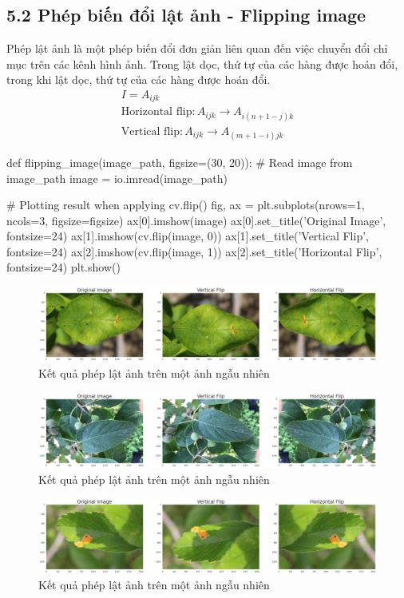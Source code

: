 \documentclass{article}
\begin{document}
	\subsection{5.2 Phép biến đổi lật ảnh - Flipping image}
	Phép lật ảnh là một phép biến đổi đơn giản liên quan đến việc chuyển đổi chỉ mục trên các kênh hình ảnh. Trong lật dọc, thứ tự của các hàng được hoán đổi, trong khi lật dọc, thứ tự của các hàng được hoán đổi.
	\begin{gather*}
	I = A_{ijk}\\
	\text{Horizontal flip}: A_{ijk} \rightarrow A_{i(n+1-j)k}\\
	\text{Vertical flip}: A_{ijk} \rightarrow A_{(m+1-i)jk}
	\end{gather*}
	\begin{python}
		def flipping_image(image_path, figsize=(30, 20)):
			# Read image from image_path
			image = io.imread(image_path)
			
			# Plotting result when applying cv.flip()
			fig, ax = plt.subplots(nrows=1, ncols=3, figsize=figsize)
			ax[0].imshow(image)
			ax[0].set_title('Original Image', fontsize=24)
			ax[1].imshow(cv.flip(image, 0))
			ax[1].set_title('Vertical Flip', fontsize=24)
			ax[2].imshow(cv.flip(image, 1))
			ax[2].set_title('Horizontal Flip', fontsize=24)
			plt.show()
	\end{python}
	\begin{figure}[H]
		\centering
		\includegraphics[width=1\linewidth]{images/flipping_image.png}
		\caption{Kết quả phép lật ảnh trên một ảnh ngẫu nhiên}
		\label{fig:writing-thesis}
	\end{figure}
	\begin{figure}[H]
		\centering
		\includegraphics[width=1\linewidth]{images/flipping_image_1.png}
		\caption{Kết quả phép lật ảnh trên một ảnh ngẫu nhiên}
		\label{fig:writing-thesis}
	\end{figure}
	\begin{figure}[H]
		\centering
		\includegraphics[width=1\linewidth]{images/flipping_image_2.png}
		\caption{Kết quả phép lật ảnh trên một ảnh ngẫu nhiên}
		\label{fig:writing-thesis}
	\end{figure}
\end{document}
